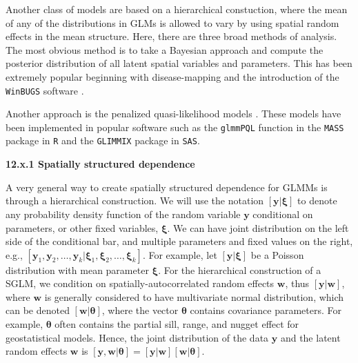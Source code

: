\documentclass[12pt, titlepage]{article}
\begin{document}
Another class of models are based on a hierarchical constuction, where the mean of any of the distributions in GLMs is allowed to vary by using spatial random effects in the mean structure.  Here, there are three broad methods of analysis.  The most obvious method is to take a Bayesian approach and compute the posterior distribution of all latent spatial variables and parameters.  This has been extremely popular beginning with disease-mapping \citep{clayton_empirical_1987} and the introduction of the \texttt{WinBUGS} software \citep{lunn_winbugs-bayesian_2000}. 

Another approach is the penalized quasi-likelihood models \citep{breslow_approximate_1993, WolfingerEtAl1993GeneralizedLinearMixed233}.  These models have been implemented in popular software such as the \texttt{glmmPQL} function in the \texttt{MASS} package in \texttt{R} and the \texttt{GLIMMIX} package in \texttt{SAS}.




{\large \flushleft \textbf{12.x.1 Spatially structured dependence}}

A very general way to create spatially structured dependence for GLMMs is through a hierarchical construction.  We will use the notation $[\mathbf{y}|\boldsymbol{\xi}]$ to denote any probability density function of the random variable $\mathbf{y}$ conditional on parameters, or other fixed variables, $\boldsymbol{\xi}$. We can have joint distribution on the left side of the conditional bar, and multiple parameters and fixed values on the right, e.g., $[\mathbf{y}_{1},\mathbf{y}_{2}, \ldots, \mathbf{y}_{k} | \boldsymbol{\xi}_{1}, \boldsymbol{\xi}_{2}, \ldots, \boldsymbol{\xi}_{k}]$. For example, let $[\mathbf{y}|\boldsymbol{\xi}]$ be a Poisson distribution with mean parameter $\boldsymbol{\xi}$.  For the hierarchical construction of a SGLM, we condition on spatially-autocorrelated random effects $\mathbf{w}$, thus $[\mathbf{y}|\mathbf{w}]$, where $\mathbf{w}$ is generally considered to have multivariate normal distribution, which can be denoted $[\mathbf{w}|\boldsymbol{\theta}]$, where the vector $\boldsymbol{\theta}$ contains covariance parameters.  For example, $\boldsymbol{\theta}$ often contains the partial sill, range, and nugget effect for geostatistical models.  Hence, the joint distribution of the data $\mathbf{y}$ and the latent random effects $\mathbf{w}$ is $[\mathbf{y},\mathbf{w}|\boldsymbol{\theta}] = [\mathbf{y}|\mathbf{w}][\mathbf{w}|\boldsymbol{\theta}]$.  
\end{document}
